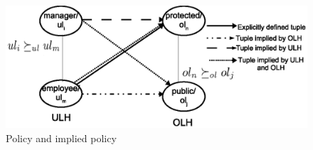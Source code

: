 
 	\begin{figure}[h]
 		\centering
 		\includegraphics[width=1\textwidth]{ABAC16/implied-policy}
 		\caption{Policy and implied policy}
 		\label{fig:implied-policy}
 	\end{figure}